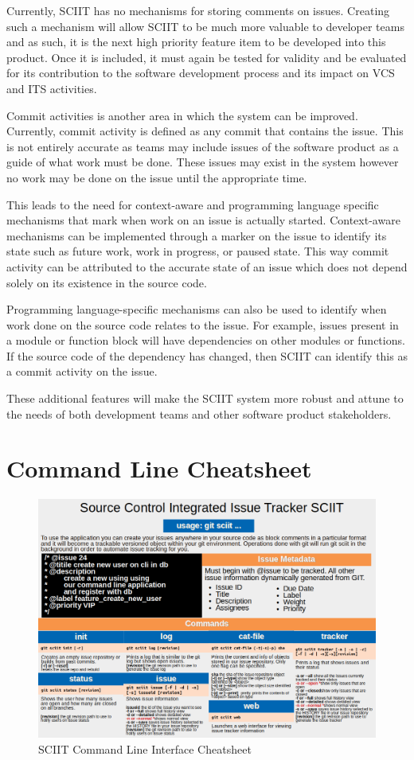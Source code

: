 \documentclass{mproj}
\begin{document}
Currently, SCIIT has no mechanisms for storing comments on issues. Creating such a mechanism will allow SCIIT to be much more valuable to developer teams and as such, it is the next high priority feature item to be developed into this product. Once it is included, it must again be tested for validity and be evaluated for its contribution to the software development process and its impact on VCS and ITS activities.

Commit activities is another area in which the system can be improved. Currently, commit activity is defined as any commit that contains the issue. This is not entirely accurate as teams may include issues of the software product as a guide of what work must be done. These issues may exist in the system however no work may be done on the issue until the appropriate time.

This leads to the need for context-aware and programming language specific mechanisms that mark when work on an issue is actually started. Context-aware mechanisms can be implemented through a marker on the issue to identify its state such as future work, work in progress, or paused state. This way commit activity can be attributed to the accurate state of an issue which does not depend solely on its existence in the source code.

Programming language-specific mechanisms can also be used to identify when work done on the source code relates to the issue. For example, issues present in a module or function block will have dependencies on other modules or functions. If the source code of the dependency has changed, then SCIIT can identify this as a commit activity on the issue.

These additional features will make the SCIIT system more robust and attune to the needs of both development teams and other software product stakeholders.


\appendix %
\chapter{Command Line Cheatsheet}
\begin{figure}[h!]
\caption{SCIIT Command Line Interface Cheatsheet}
\label{fig:sciit-cheatsheet}
\centering
\includegraphics[width=16cm]{Cheatsheet}
\end{figure}




\end{document}
